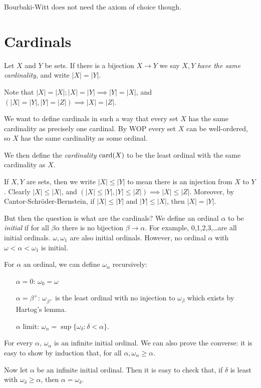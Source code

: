 \documentclass[10pt,a4paper]{article}
\begin{document}
Bourbaki-Witt does not need the axiom of choice though.

\section{Cardinals}
Let $X$ and $Y$ be sets. If there is a bijection $X \to Y$ we say $X,Y$ \emph{have the same cardinality}, and write $|X| = |Y|$.

Note that $|X|=|X|; |X|=|Y|\implies|Y|=|X|$, and $(|X|=|Y|,|Y|=|Z|) \implies |X|=|Z|$.

We want to define cardinals in such a way that every set $X$ has the same cardinality as precisely one cardinal. By WOP every set $X$ can be well-ordered, so $X$ has the same cardinality as some ordinal.

We then define the \emph{cardinality} $\operatorname{card}(X)$ to be the least ordinal with the same cardinality as $X$. 

If $X, Y$ are sets, then we write $|X|\leq |Y|$ to mean there is an injection from $X$ to $Y$. Clearly $|X|\leq |X|$, and $(|X|\leq |Y|, |Y|\leq |Z|) \implies |X|\leq|Z|$. Moreover, by Cantor-Schr\"oder-Bernstein, if $|X|\leq |Y|$ and $|Y| \leq |X|$, then $|X|=|Y|$.

But then the question is what are the cardinals? We define an ordinal $\alpha$ to be \emph{initial} if for all $\beta \alpha$ there is no bijection $\beta \to \alpha$. For example, 0,1,2,3,\ldots are all initial ordinals. $\omega, \omega_1$ are also initial ordinals. However, no ordinal $\alpha$ with $\omega <\alpha <\omega_1$ is initial.

For $\alpha$ an ordinal, we can define $\omega_\alpha$ recursively:
\begin{itemize}
\item[$\alpha=0$:] $\omega_0 = \omega$
\item[$\alpha=\beta^+$:] $\omega_{\beta^+}$ is the least ordinal with no injection to $\omega_{\beta}$ which exists by Hartog's lemma.
\item[$\alpha$ limit:] $\omega_\alpha = \sup\{\omega_{\delta} : \delta < \alpha\}$.
\end{itemize}
For every $\alpha$, $\omega_\alpha$ is an infinite initial ordinal. We can also prove the converse: it is easy to show by induction that, for all $\alpha, \omega_\alpha \geq \alpha$.

Now let $\alpha$ be an infinite initial ordinal. Then it is easy to check that, if $\delta$ is least with $\omega_\delta \geq \alpha$, then $\alpha = \omega_\delta$.
\end{document}
